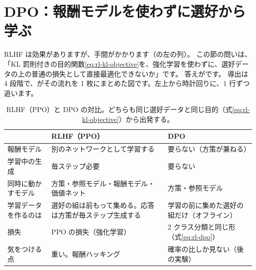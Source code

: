 \section{DPO：報酬モデルを使わずに選好から学ぶ}\label{sec:rl-dpo}

RLHF は効果がありますが、手間がかかります（の左の列）。
この節の問いは、「KL 罰則付きの目的関数\eqref{eq:rl-kl-objective}を、強化学習を使わずに、選好データの上の普通の損失として直接最適化できないか」です。
答えがです\cite{rafailov2023direct}。
導出は 4 段階で、がその流れを 1 枚にまとめた図です。左上から時計回りに、1 行ずつ追います。

\begin{table}[tbp]
\centering
\caption{RLHF（PPO）と DPO の対比。どちらも同じ選好データと同じ目的（式\eqref{eq:rl-kl-objective}）から出発する。}
\label{tab:rl-rlhf-vs-dpo}
\small
\begin{tabular}{p{27mm}p{45mm}p{45mm}}
\toprule
 & RLHF（PPO） & DPO \\
\midrule
報酬モデル & 別のネットワークとして学習する & 要らない（方策が兼ねる） \\ \addlinespace
学習中の生成 & 毎ステップ必要 & 要らない \\ \addlinespace
同時に動かすモデル & 方策・参照モデル・報酬モデル・価値ネット & 方策・参照モデル \\ \addlinespace
学習データを作るのは & 選好の組は前もって集める。応答は方策が毎ステップ生成する & 学習の前に集めた選好の組だけ（オフライン） \\ \addlinespace
損失 & PPO の損失（強化学習） & 2 クラス分類と同じ形（式\eqref{eq:rl-dpo}） \\ \addlinespace
気をつける点 & 重い。報酬ハッキング & 確率の比しか見ない（後の実験） \\
\bottomrule
\end{tabular}
\end{table}

